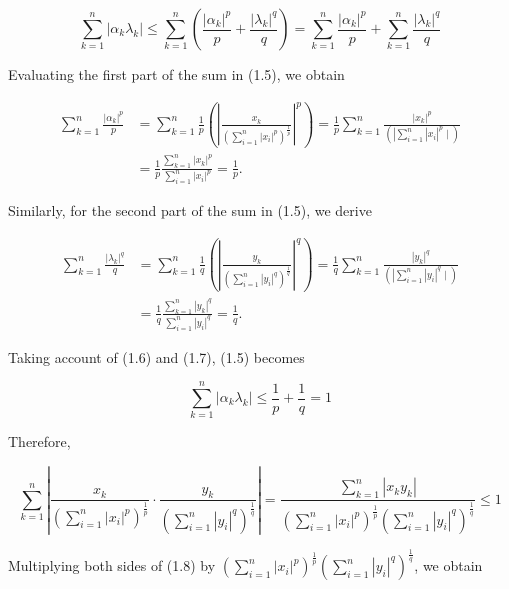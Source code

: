 \documentclass{article}
\begin{document}
$$
\sum_{k=1}^{n}\left|\alpha_{k} \lambda_{k}\right| \leq \sum_{k=1}^{n}\left(\frac{\left|\alpha_{k}\right|^{p}}{p}+\frac{\left|\lambda_{k}\right|^{q}}{q}\right)=\sum_{k=1}^{n} \frac{\left|\alpha_{k}\right|^{p}}{p}+\sum_{k=1}^{n} \frac{\left|\lambda_{k}\right|^{q}}{q}
$$

Evaluating the first part of the sum in (1.5), we obtain

$$
\begin{aligned}
\sum_{k=1}^{n} \frac{\left|\alpha_{k}\right|^{p}}{p} & =\sum_{k=1}^{n} \frac{1}{p}\left(\left|\frac{x_{k}}{\left(\sum_{i=1}^{n}\left|x_{i}\right|^{p}\right)^{\frac{1}{p}}}\right|^{p}\right)=\frac{1}{p} \sum_{k=1}^{n} \frac{\left|x_{k}\right|^{p}}{\left(\left.\left|\sum_{i=1}^{n}\right| x_{i}\right|^{p} \mid\right)} \\
& =\frac{1}{p} \frac{\sum_{k=1}^{n}\left|x_{k}\right|^{p}}{\sum_{i=1}^{n}\left|x_{i}\right|^{p}}=\frac{1}{p} .
\end{aligned}
$$

Similarly, for the second part of the sum in (1.5), we derive

$$
\begin{aligned}
\sum_{k=1}^{n} \frac{\left|\lambda_{k}\right|^{q}}{q} & =\sum_{k=1}^{n} \frac{1}{q}\left(\left|\frac{y_{k}}{\left(\sum_{i=1}^{n}\left|y_{i}\right|^{q}\right)^{\frac{1}{q}}}\right|^{q}\right)=\frac{1}{q} \sum_{k=1}^{n} \frac{\left|y_{k}\right|^{q}}{\left(\left.\left|\sum_{i=1}^{n}\right| y_{i}\right|^{q} \mid\right)} \\
& =\frac{1}{q} \frac{\sum_{k=1}^{n}\left|y_{k}\right|^{q}}{\sum_{i=1}^{n}\left|y_{i}\right|^{q}}=\frac{1}{q} .
\end{aligned}
$$

Taking account of (1.6) and (1.7), (1.5) becomes

$$
\sum_{k=1}^{n}\left|\alpha_{k} \lambda_{k}\right| \leq \frac{1}{p}+\frac{1}{q}=1
$$

Therefore,

$$
\sum_{k=1}^{n}\left|\frac{x_{k}}{\left(\sum_{i=1}^{n}\left|x_{i}\right|^{p}\right)^{\frac{1}{p}}} \cdot \frac{y_{k}}{\left(\sum_{i=1}^{n}\left|y_{i}\right|^{q}\right)^{\frac{1}{q}}}\right|=\frac{\sum_{k=1}^{n}\left|x_{k} y_{k}\right|}{\left(\sum_{i=1}^{n}\left|x_{i}\right|^{p}\right)^{\frac{1}{p}}\left(\sum_{i=1}^{n}\left|y_{i}\right|^{q}\right)^{\frac{1}{q}}} \leq 1
$$

Multiplying both sides of (1.8) by $\left(\sum_{i=1}^{n}\left|x_{i}\right|^{p}\right)^{\frac{1}{p}}\left(\sum_{i=1}^{n}\left|y_{i}\right|^{q}\right)^{\frac{1}{q}}$, we obtain
\end{document}

